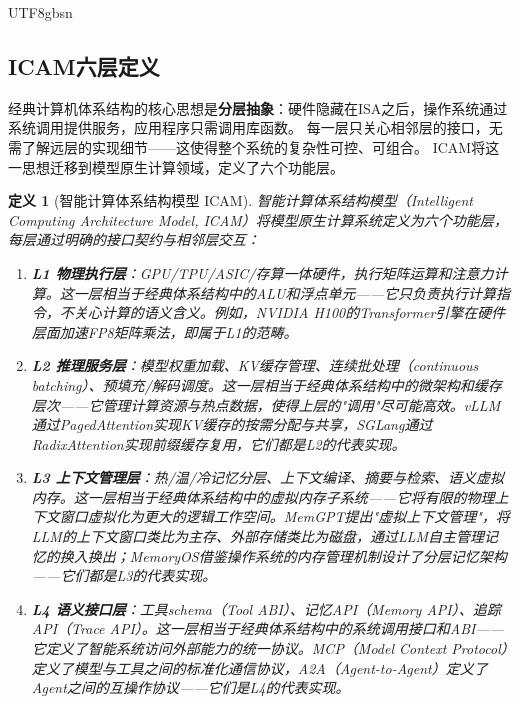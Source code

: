 \documentclass[11pt,a4paper]{article}
\newtheorem{definition}{定义}[section]
\begin{document}
\begin{CJK*}{UTF8}{gbsn}
\subsection{ICAM六层定义}
\label{sec:icam-layers}

经典计算机体系结构的核心思想是\textbf{分层抽象}：硬件隐藏在ISA之后，操作系统通过系统调用提供服务，应用程序只需调用库函数。
每一层只关心相邻层的接口，无需了解远层的实现细节——这使得整个系统的复杂性可控、可组合。
ICAM将这一思想迁移到模型原生计算领域，定义了六个功能层。

\begin{definition}[智能计算体系结构模型 ICAM]
智能计算体系结构模型（Intelligent Computing Architecture Model, ICAM）将模型原生计算系统定义为六个功能层，每层通过明确的接口契约与相邻层交互：
\begin{enumerate}[nosep]
\item \textbf{L1 物理执行层}：GPU/TPU/ASIC/存算一体硬件，执行矩阵运算和注意力计算。这一层相当于经典体系结构中的ALU和浮点单元——它只负责执行计算指令，不关心计算的语义含义。例如，NVIDIA H100的Transformer引擎在硬件层面加速FP8矩阵乘法，即属于L1的范畴。

\item \textbf{L2 推理服务层}：模型权重加载、KV缓存管理、连续批处理（continuous batching）、预填充/解码调度。这一层相当于经典体系结构中的微架构和缓存层次——它管理计算资源与热点数据，使得上层的"调用"尽可能高效。vLLM通过PagedAttention实现KV缓存的按需分配与共享\cite{kwon2023pagedattention}，SGLang通过RadixAttention实现前缀缓存复用\cite{sglang2024}，它们都是L2的代表实现。

\item \textbf{L3 上下文管理层}：热/温/冷记忆分层、上下文编译、摘要与检索、语义虚拟内存。这一层相当于经典体系结构中的虚拟内存子系统——它将有限的物理上下文窗口虚拟化为更大的逻辑工作空间。MemGPT提出"虚拟上下文管理"，将LLM的上下文窗口类比为主存、外部存储类比为磁盘，通过LLM自主管理记忆的换入换出\cite{memgpt2023}；MemoryOS借鉴操作系统的内存管理机制设计了分层记忆架构\cite{memoryos2025}——它们都是L3的代表实现。

\item \textbf{L4 语义接口层}：工具schema（Tool ABI）、记忆API（Memory API）、追踪API（Trace API）。这一层相当于经典体系结构中的系统调用接口和ABI——它定义了智能系统访问外部能力的统一协议。MCP（Model Context Protocol）定义了模型与工具之间的标准化通信协议\cite{mcp_intro_2026}，A2A（Agent-to-Agent）定义了Agent之间的互操作协议\cite{agentprotocols2025}——它们是L4的代表实现。


\end{enumerate}
\end{definition}
\end{CJK*}
\end{document}
